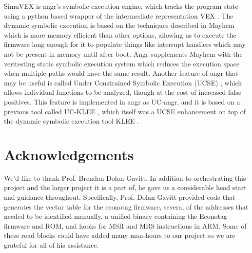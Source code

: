 \documentclass[letterpaper, 11 pt, conference]{ieeeconf}
\begin{document}
SimuVEX is angr's symbolic execution engine, which tracks the program state using a python based wrapper \cite{pyvex} of the intermediate representation VEX \cite{vex}. The dynamic symbolic execution is based on the techniques described in Mayhem \cite{mayhem} which is more memory efficient than other options, allowing us to execute the firmware long enough for it to populate things like interrupt handlers which may not be present in memory until after boot. Angr supplements Mayhem with the veritesting static symbolic execution system \cite{veritesting} which reduces the execution space when multiple paths would have the same result. Another feature of angr that may be useful is called Under Constrained Symbolic Execution (UCSE) \cite{ucklee2}, which allows individual functions to be analyzed, though at the cost of increased false positives. This feature is implemented in angr as UC-angr, and it is based on a previous tool called UC-KLEE \cite{ucklee1}, which itself was a UCSE enhancement on top of the dynamic symbolic execution tool KLEE \cite{klee}.

\section{Acknowledgements}
We'd like to thank Prof. Brendan Dolan-Gavitt. In addition to orchestrating this project and the larger project it is a part of, he gave us a considerable head start and guidance throughout. Specifically, Prof. Dolan-Gavitt provided code that generates the vector table for the econotag firmware, several of the addresses that needed to be identified manually, a unified binary containing the Econotag firmware and ROM, and hooks for MSR and MRS instructions in ARM. Some of these road blocks could have added many man-hours to our project so we are grateful for all of his assistance.

{}

\end{document}
